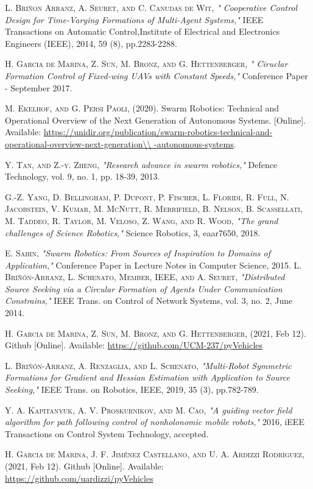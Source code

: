 
\begin{thebibliography}{11}

\textsc{L. Briñon Arranz, A. Seuret, and C. Canudas de Wit,} 
\textit{" Cooperative Control Design for Time-Varying Formations of Multi-Agent Systems,"} IEEE Transactions on Automatic Control,Institute of Electrical and Electronics Engineers (IEEE), 2014, 59 (8), pp.2283-2288.

\textsc{H. Garcia de Marina, Z. Sun, M. Bronz, and G. Hettenberger,} 
\textit{" Ciruclar Formation Control of Fixed-wing UAVs with Constant Speeds,"} Conference Paper - September 2017.

\textsc{M. Ekelhof, and G. Persi Paoli,} (2020). Swarm Robotics: Technical and Operational Overview of the Next Generation of Autonomous Systems. [Online]. Available: \url{https://unidir.org/publication/swarm-robotics-technical-and-operational-overview-next-generation\\
-autonomous-systems}.

\textsc{Y. Tan, and Z.-y. Zheng,} 
\textit{"Research advance in swarm robotics,"} Defence Technology, vol. 9, no. 1, pp. 18-39, 2013. 

\textsc{G.-Z. Yang, D. Bellingham, P. Dupont, P. Fischer, L. Floridi, R. Full, N. Jacobstein, V. Kumar, M. McNutt, R. Merrifield, B. Nelson, B. Scassellati, M. Taddeo, R. Taylor, M. Veloso, Z. Wang, and R. Wood,} 
\textit{"The grand challenges of Science Robotics,"} Science Robotics, 3, eaar7650, 2018.

\textsc{E. Sahin,} 
\textit{"Swarm Robotics: From Sources of Inspiration to Domains of Application,"} Conference Paper in Lecture Notes in Computer Science, 2015.
\newpage
{}
\textsc{L. Briñón-Arranz, L. Schenato, Member, IEEE, and A. Seuret,} 
\textit{"Distributed Source Seeking via a Circular Formation of Agents Under Communication Constrains,"} IEEE Trans. on Control of Network Systems, vol. 3, no. 2, June 2014.

\textsc{H. Garcia de Marina, Z. Sun, M. Bronz, and G. Hettenberger,} (2021, Feb 12). Github [Online]. Available: \url{https://github.com/UCM-237/pyVehicles}

\textsc{L. Briñón-Arranz, A. Renzaglia, and L. Schenato,} 
\textit{"Multi-Robot Symmetric Formations for Gradient and Hessian Estimation with Application to Source Seeking,"} IEEE Trans. on Robotics, IEEE, 2019, 35 (3), pp.782-789.

\textsc{Y. A. Kapitanyuk, A. V. Proskurnikov, and M. Cao,} 
\textit{"A guiding vector field algorithm for path following control of nonholonomic mobile robots,"} 2016, iEEE Transactions on Control System Technology, accepted. 

\textsc{H. Garcia de Marina, J. F. Jiménez Castellano, and U. A. Ardizzi Rodríguez,} (2021, Feb 12). Github [Online]. Available: \url{https://github.com/uardizzi/pyVehicles}

\end{thebibliography}
